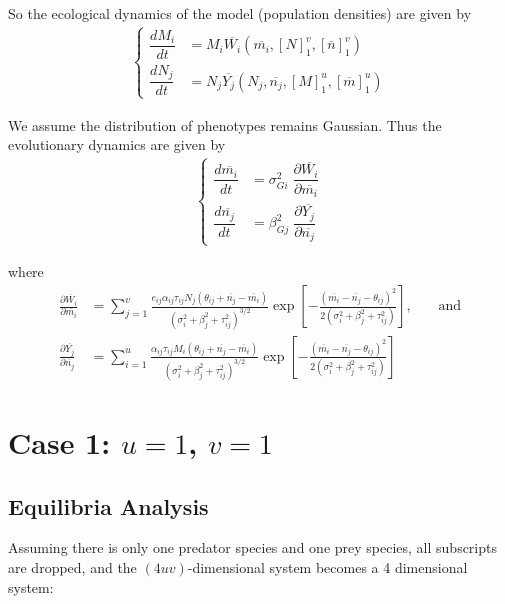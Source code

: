 \documentclass[10pt]{beamer}
\begin{document}
\noindent So the ecological dynamics of the model (population densities) are given by
\begin{align}
	\begin{cases}
		\dfrac{dM_i}{dt} &= M_i \overline{W_i}(\overline{m_i}, [N]_1^v, [\overline{n}]_1^v) \\[.25cm]
		\dfrac{dN_j}{dt} &= N_j \overline{Y_j}(N_j, \overline{n_j}, [M]_1^u, [\overline{m}]_1^u)
	\end{cases}
\end{align}

\noindent We assume the distribution of phenotypes remains Gaussian.  Thus the evolutionary dynamics are given by
\begin{align}
	\begin{cases}
		\dfrac{d\overline{m_i}}{dt} &= \sigma_{Gi}^2 \; \dfrac{\partial \overline{W_i}}{\partial \overline{m_i}} \\[.25cm]
		\dfrac{d\overline{n_j}}{dt} &= \beta_{Gj}^2 \; \dfrac{\partial \overline{Y_j}}{\partial \overline{n_j}}
	\end{cases}
\end{align}

\noindent where
\begin{align*}
	\frac{\partial \overline{W_i}}{\partial \overline{m_i}} &= \sum_{j=1}^v\frac{e_{ij}\alpha_{ij}\tau_{ij}N_j(\theta_{ij} + \overline{n_j} - \overline{m_i})}{(\sigma_i^2 + \beta_j^2 + \tau_{ij}^2)^{3/2}} \exp\left[{-\frac{(\overline{m_i} - \overline{n_j} - \theta_{ij})^2}{2(\sigma_i^2 + \beta_j^2 + \tau_{ij}^2)}}\right]\text{,} \qquad\text{and} \\
	\frac{\partial \overline{Y_j}}{\partial \overline{n_j}} &= \sum_{i=1}^u\frac{\alpha_{ij}\tau_{ij}M_i(\theta_{ij} + \overline{n_j} - \overline{m_i})}{(\sigma_i^2 + \beta_j^2 + \tau_{ij}^2)^{3/2}} \exp\left[{-\frac{(\overline{m_i} - \overline{n_j} - \theta_{ij})^2}{2(\sigma_i^2 + \beta_j^2 + \tau_{ij}^2)}}\right]
\end{align*}

\vskip 30pt

									\section{Case 1: $u = 1$, $v = 1$}
									\subsection{Equilibria Analysis}


Assuming there is only one predator species and one prey species, all subscripts are dropped, and the $(4uv)$-dimensional system becomes a 4 dimensional system:
\end{document}
